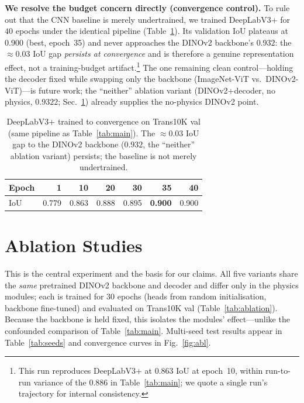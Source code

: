 \documentclass[conference]{IEEEtran}
\newcommand{\dinov}{DINOv2}
\newcommand{\iou}{IoU}
\newcommand{\best}[1]{\textbf{#1}}
\begin{document}
\textbf{We resolve the budget concern directly (convergence control).} To rule
out that the CNN baseline is merely undertrained, we trained DeepLabV3+ for $40$
epochs under the identical pipeline (Table~\ref{tab:converge}). Its validation
\iou{} plateaus at $0.900$ (best, epoch~35) and never approaches the \dinov{}
backbone's $0.932$: the ${\approx}0.03$ \iou{} gap \emph{persists at
convergence} and is therefore a genuine representation effect, not a
training-budget artifact.\footnote{This run reproduces DeepLabV3+ at $0.863$
\iou{} at epoch~10, within run-to-run variance of the $0.886$ in
Table~\ref{tab:main}; we quote a single run's trajectory for internal
consistency.} The one remaining clean control---holding the decoder fixed while
swapping only the backbone (ImageNet-ViT vs.\ \dinov-ViT)---is future work; the
``neither'' ablation variant (\dinov{}+decoder, no physics, $0.9322$;
Sec.~\ref{sec:ablation}) already supplies the no-physics DINOv2 point.

\begin{table}[t]
\centering
\caption{DeepLabV3+ trained to convergence on Trans10K val (same pipeline as
Table~\ref{tab:main}). The ${\approx}0.03$ \iou{} gap to the \dinov{} backbone
($0.932$, the ``neither'' ablation variant) persists; the baseline is not merely
undertrained.}
\label{tab:converge}
\setlength{\tabcolsep}{5pt}
\begin{tabular}{lrrrrrr}
\toprule
Epoch & 1 & 10 & 20 & 30 & 35 & 40 \\
\midrule
\iou{} & 0.779 & 0.863 & 0.888 & 0.895 & \best{0.900} & 0.900 \\
\bottomrule
\end{tabular}
\end{table}

\section{Ablation Studies}
\label{sec:ablation}
This is the central experiment and the basis for our claims. All five variants
share the \emph{same} pretrained \dinov{} backbone and decoder and differ only in
the physics modules; each is trained for $30$ epochs (heads from random
initialisation, backbone fine-tuned) and evaluated on Trans10K val
(Table~\ref{tab:ablation}). Because the backbone is held fixed, this isolates the
modules' effect---unlike the confounded comparison of Table~\ref{tab:main}.
Multi-seed test results appear in Table~\ref{tab:seeds} and convergence curves in
Fig.~\ref{fig:abl}.
\end{document}
